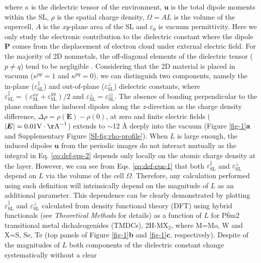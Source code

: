 \documentclass[journal=ancac3,manuscript=article,email=true,hyperref=true,keywords=false]{achemso}
\begin{document}
where $\kappa$ is the dielectric tensor of the environment,
$\boldsymbol{u}$ is the total dipole moments within the SL, $\rho$ is
the spatial charge density, $\Omega=AL$ is the volume of the
supercell, $A$ is the \textit{xy}-plane area of the SL and
$\varepsilon_{0}$ is vacuum permittivity. Here we only study the
electronic contribution to the dielectric constant where the dipole
$\boldsymbol{P}$ comes from the displacement of electron cloud under
external electric field. For the majority of 2D nonmetals, the
off-diagonal elements of the dielectric tensor ($p \neq q$) tend to be
negligible .  Considering that the 2D material is placed in vacuum
($\kappa^{pp} = 1$ and $\kappa^{pq} = 0$), we can distinguish two
components, namely the in-plane
($\varepsilon_{\mathrm{SL}}^{\parallel}$) and out-of-plane
($\varepsilon_{\mathrm{SL}}^{\perp}$) dielectric constants, where
$\varepsilon_{\mathrm{SL}}^{\parallel} =
(\varepsilon_{\mathrm{SL}}^{xx} + \varepsilon_{\mathrm{SL}}^{yy})/2$
and
$\varepsilon_{\mathrm{SL}}^{\perp} = \varepsilon_{\mathrm{SL}}^{zz}$.
The absence of bonding perpendicular to the plane confines the induced
dipoles along the \textit{z}-direction as the charge density
difference, $\Delta \rho=\rho(\boldsymbol{E}) - \rho(0)$, at zero and
finite electric fields
($|\boldsymbol{E}_{}|=0.01 \mathrm{V\cdot \AA}^{-1}$) extends to
$\sim{}$12 \AA{} deeply into the vacuum (Figure \ref{fig-1}{\bf a} and
Supplementary Figure \ref{SI-fig:rho-profile}). When $L$ is large
enough, the induced dipoles $\boldsymbol{u}$ from the periodic images
do not interact mutually as the integral in Eq. \ref{eq:def-eps-2}
depends only locally on the atomic charge density at the layer.
However, we can see from Eqs. \ref{eq:def-eps-1} that both
$\varepsilon^{\parallel}_{\mathrm{SL}}$ and
$\varepsilon^{\perp}_{\mathrm{SL}}$ depend on $L$ via the volume of
the cell $\Omega$.  Therefore, any calculation performed using such
definition will intrinsically depend on the magnitude of $L$ as an
additional parameter.  This dependence can be clearly demonstrated by
plotting $\varepsilon^{\parallel}_{\mathrm{SL}}$ and
$\varepsilon^{\perp}_{\mathrm{SL}}$ calculated from density functional
theory (DFT) using hybrid functionals (see {\it Theoretical Methods} for details)
as a function of $L$ for P$\bar{6}$m2 transitional metal
dichalcogenides (TMDCs), 2H-MX$_{2}$, where M=Mo, W and X=S, Se, Te
(top panels of Figure \ref{fig-1}{\bf b} and \ref{fig-1}{\bf c},
respectively).  Despite of the magnitudes of $L$ both components of
the dielectric constant change systematically without a clear
\end{document}
